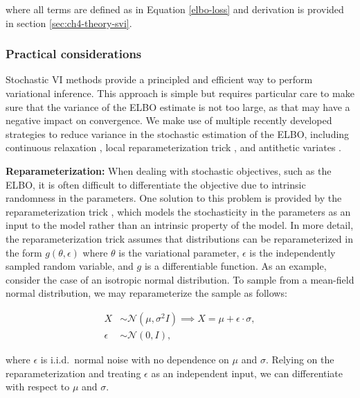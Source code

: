 where all terms are defined as in Equation \ref{elbo-loss} and derivation is provided in section \ref{sec:ch4-theory-svi}.

\subsubsection{Practical considerations}
Stochastic VI methods provide a principled and efficient way to perform variational inference.
%
This approach is simple but requires particular care to make sure that the variance of the ELBO estimate is not too large, as that may have a negative impact on convergence.
%
We make use of multiple recently developed strategies to reduce variance in the stochastic estimation of the ELBO, including continuous relaxation \cite{maddison2016concrete,jang2016categorical}, local reparameterization trick \cite{kingma2015variational}, and antithetic variates \cite{hammersley1956new}.

\vspace{2mm}

\noindent \textbf{Reparameterization:}
When dealing with stochastic objectives, such as the ELBO, it is often difficult to differentiate the objective due to intrinsic randomness in the parameters.
%
One solution to this problem is provided by the reparameterization trick \cite{kingma2013auto,blundell2015weight}, which models the stochasticity in the parameters as an input to the model rather than an intrinsic property of the model.
%
In more detail, the reparameterization trick assumes that distributions can be reparameterized in the form $g(\theta,\epsilon)$ where $\theta$ is the variational parameter, $\epsilon$ is the independently sampled random variable, and $g$ is a differentiable function.
%
As an example, consider the case of an isotropic normal distribution.
%
To sample from a mean-field normal distribution, we may reparameterize the sample as follows:

\begin{align}
    X &\sim \mathcal{N}(\mu, \sigma^2 I) \implies X = \mu + \epsilon \cdot \sigma, \nonumber \\
    \epsilon &\sim  \mathcal{N}(0, I),
\end{align}

where $\epsilon$ is i.i.d.\ normal noise with no dependence on $\mu$ and $\sigma$.
%
Relying on the reparameterization and treating $\epsilon$ as an independent input, we can differentiate with respect to $\mu$ and $\sigma$.
%

